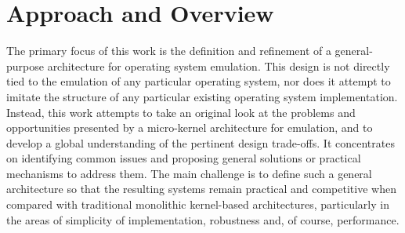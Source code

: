 
\section{Approach and Overview}

The primary focus of this work is the definition and refinement of a
general-purpose architecture for operating system emulation. This
design is not directly tied to the emulation of any particular
operating system, nor does it attempt to imitate the structure of any
particular existing operating system implementation. Instead, this
work attempts to take an original look at the problems and
opportunities presented by a micro-kernel architecture for emulation,
and to develop a global understanding of the pertinent design
trade-offs.  It concentrates on identifying common issues and
proposing general solutions or practical mechanisms to address them.
The main challenge is to define such a general architecture so that
the resulting systems remain practical and competitive when compared
with traditional monolithic kernel-based architectures, particularly
in the areas of simplicity of implementation, robustness and, of
course, performance.



